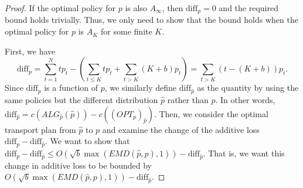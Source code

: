 \begin{proof}
    If the optimal policy for $p$ is also $A_\infty$, then $\text{diff}_p = 0$ and the required bound holds trivially. Thus, we only need to show that the bound holds when the optimal policy for $p$ is $A_K$ for some finite $K$.

    First, we have 
    $$\text{diff}_p = \sum_{t=1}^N tp_t - (\sum_{t \leq K}tp_t + \sum_{t>K}(K+b)p_t) = \sum_{t>K}(t-(K+b))p_t.$$ 
    Since $\text{diff}_p$ is a function of $p$, we similarly define $\text{diff}_{\hat{p}}$ as the quantity by using the same policies but the different distribution $\hat{p}$ rather than $p$. In other words, $\text{diff}_{\hat{p}} = c(ALG_{\hat{p}}(\hat{p})) - c((OPT_p)_{\hat{p}})$. Then, we consider the optimal transport plan from $\hat{p}$ to $p$ and examine the change of the additive loss $\text{diff}_p - \text{diff}_{\hat{p}}$. We want to show that $\text{diff}_p - \text{diff}_{\hat{p}} \leq O(\sqrt{b}\max(EMD(\hat{p},p),1)) - \text{diff}_{\hat{p}}$. That is, we want this change in additive loss to be bounded by $O(\sqrt{b}\max(EMD(\hat{p},p),1)) - \text{diff}_{\hat{p}}$.


\end{proof}
